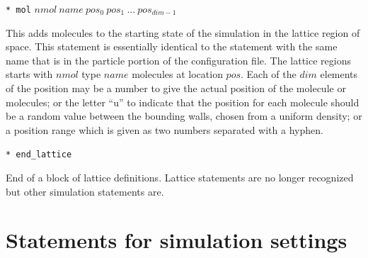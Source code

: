 \documentclass {book}
\newcommand {\ttt} {\texttt}
\begin{document}
\begin{description}
\item{\ttt{* mol} $nmol\ name\ pos_0\ pos_1\ ...\ pos_{dim-1}$}

This adds molecules to the starting state of the simulation in the lattice region of space. This statement is essentially identical to the statement with the same name that is in the particle portion of the configuration file. The lattice regions starts with $nmol$ type $name$ molecules at location $pos$. Each of the $dim$ elements of the position may be a number to give the actual position of the molecule or molecules; or the letter ``u'' to indicate that the position for each molecule should be a random value between the bounding walls, chosen from a uniform density; or a position range which is given as two numbers separated with a hyphen.

\item{\ttt{* end\_lattice}}

End of a block of lattice definitions. Lattice statements are no longer recognized but other simulation statements are.

\end{description}

\section{Statements for simulation settings}
\end{document}
